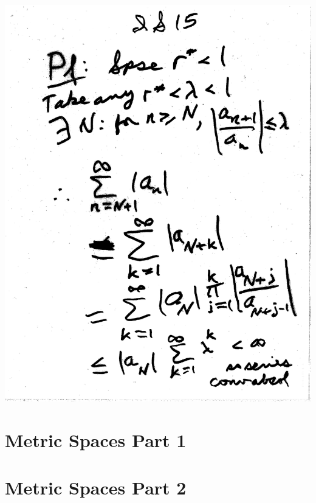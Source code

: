 \documentclass[10pt,a4paper]{article}
\begin{document}
\includegraphics[scale=.5]{Pages/IS_15}

\newpage




\section{Metric Spaces Part 1}





\section{Metric Spaces Part 2}




\end{document}

